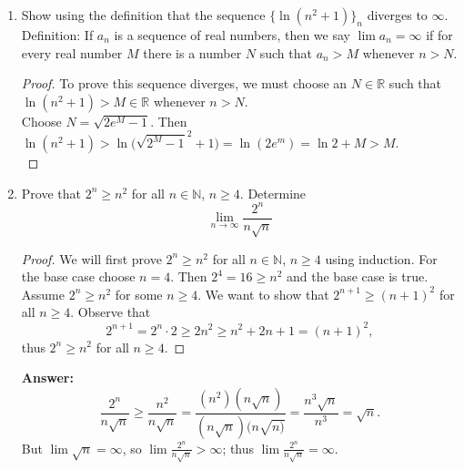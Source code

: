 \documentclass{article}
\begin{document}
\begin{enumerate}
\begin{enumerate}
                \item Prove that $\{a_n\}_n$ converges and find its limit.
                    \begin{proof}
                    By the monotone convergence theorem, $\{a_n\}_n$ is convergent.\\
                    Let $l = \lim_{n \to \infty} a_n \in \mathbb{R}$. Then,
                        \[\lim_{n \to \infty} a_{n+1} = 2-\frac{1}{a_n}\]
                        \[l = 2-\frac{1}{l}\]
                        \[l^2-2l+1 = 0.\]
                    Solving this equation for $l$, we achieve $l = 1$, so $\lim_{n \to \infty} a_n = 1$.\\
                    \end{proof}
            \end{enumerate}
        
        \item Show using the definition that the sequence $\{\ln{(n^2+1)}\}_n$ diverges to $\infty$.\\
        Definition: If $a_n$ is a sequence of real numbers, then we say $\lim a_n = \infty$ if for every real number $M$ there is a number $N$ such that $a_n > M$ whenever $n > N$.
            \begin{proof}
                To prove this sequence diverges, we must choose an $N\in \mathbb{R}$ such that $\ln{(n^2+1)} > M \in \mathbb{R}$ whenever $n > N$.\\
                Choose $N = \sqrt{2e^M-1}$. Then $\ln{(n^2+1)} > \ln{\big(\sqrt{2^M-1}^2+1\big)} = \ln{(2e^m)} = \ln{2}+M > M$.\\
            \end{proof}
        
        \item Prove that $2^n \geq n^2$ for all $n \in \mathbb{N}$, $n \geq 4$. Determine
            \[\lim_{n \to \infty} \frac{2^n}{n\sqrt{n}}\]
            \begin{proof}
                We will first prove $2^n \geq n^2$ for all $n \in \mathbb{N}$, $n\geq 4$ using induction. For the base case choose $n = 4$. Then $2^4 = 16 \geq n^2$ and the base case is true. Assume $2^n \geq n^2$ for some $n \geq 4$. We want to show that $2^{n+1} \geq (n+1)^2$ for all $n \geq 4$. Observe that
                    \[2^{n+1}=2^n \cdot 2 \geq 2n^2 \geq n^2+2n+1 = (n+1)^2,\]
                thus $2^n \geq n^2$ for all $n \geq 4$.
            \end{proof}
            \textbf{Answer: }
                \[\frac{2^n}{n\sqrt{n}} \geq \frac{n^2}{n\sqrt{n}} = \frac{(n^2)(n\sqrt{n})}{(n\sqrt{n})(n\sqrt{n)}} = \frac{n^3\sqrt{n}}{n^3} = \sqrt{n}.\]
            But $\lim \sqrt{n} = \infty$, so $\lim \frac{2^n}{n\sqrt{n}} > \infty$; thus $\lim\frac{2^n}{n\sqrt{n}} = \infty$.
    \end{enumerate}
\end{document}
